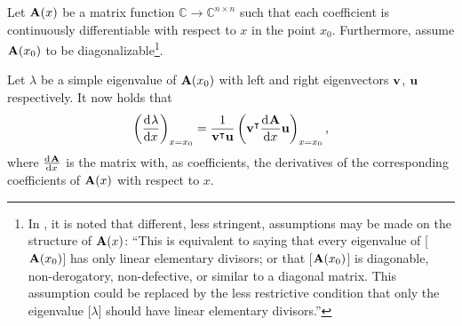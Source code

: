\begin{theorem}[Lancaster 1964]\label{the:c3_eigenvalue_derivative}
  Let $\vb{A}(x)$ be a matrix function $\mathbb{C} \to \mathbb{C}^{n\times n}$ such that each coefficient is continuously differentiable with respect to $x$ in the point $x_0$. Furthermore, assume $\vb{A}(x_0)$ to be diagonalizable\footnote{In \cite{lancaster_eigenvalues_1964}, it is noted that different, less stringent, assumptions may be made on the structure of $\vb{A}(x)$: ``This is equivalent to saying that every eigenvalue of [$\vb{A}(x_0)$] has only linear elementary divisors; or that [$\vb{A}(x_0)$] is diagonable, non-derogatory, non-defective, or similar to a diagonal matrix. This assumption could be replaced by the less restrictive condition that only the eigenvalue [$\lambda$] should have linear elementary divisors.''}.

  Let $\lambda$ be a simple eigenvalue of $\vb{A}(x_0)$ with left and right eigenvectors $\vb{v}$, $\vb{u}$ respectively. It now holds that
  $$
    \left(\dv[]{\lambda}{x}\right)_{x=x_0} = \frac{1}{{\vb{v}}^\intercal\vb{u}} \left({\vb{v}}^\intercal\dv[]{\vb{A}}{x} \vb{u} \right)_{x=x_0}\text{,}
  $$
  where $\dv[]{\vb{A}}{x}$ is the matrix with, as coefficients, the derivatives of the corresponding coefficients of $\vb{A}(x)$ with respect to $x$.
\end{theorem}
